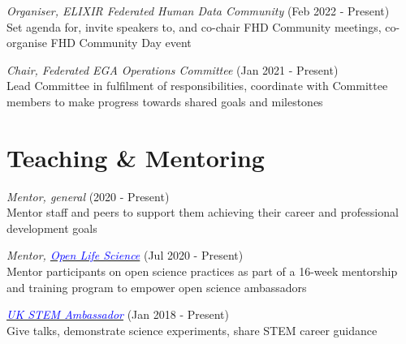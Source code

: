 \documentclass[margin,line]{res}
\begin{document}
\begin{resume}
{\em Organiser, ELIXIR Federated Human Data Community} (Feb 2022 - Present)\\
Set agenda for, invite speakers to, and co-chair FHD Community meetings, co-organise FHD Community Day event

{\em Chair, Federated EGA Operations Committee} (Jan 2021 - Present)\\
Lead Committee in fulfilment of responsibilities, coordinate with Committee members to make progress towards shared goals and milestones

\section{\sc Teaching \& Mentoring}
{\em Mentor, general} (2020 - Present)\\
Mentor staff and peers to support them achieving their career and professional development goals

{\em Mentor, \href{https://openlifesci.org/}{\textcolor{blue}{Open Life Science}}} (Jul 2020 - Present)\\
Mentor participants on open science practices as part of a 16-week mentorship and training program to empower open science ambassadors

{\em \href{https://www.stem.org.uk//}{\textcolor{blue}{UK STEM Ambassador}}} (Jan 2018 - Present)\\
Give talks, demonstrate science experiments, share STEM career guidance






\end{resume}
\end{document}
